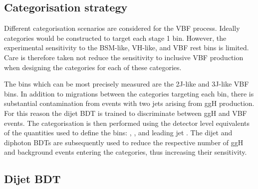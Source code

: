 \subsection{Categorisation strategy}

Different categorisation scenarios are considered for the VBF process.
Ideally categories would be constructed to target each stage 1 bin.
However, the experimental sensitivity to the BSM-like, VH-like, and VBF rest bins is limited.
Care is therefore taken not reduce the sensitivity to inclusive VBF production when designing 
the categories for each of these categories.

The bins which can be most precisely measured are the 2J-like and 3J-like VBF bins.
In addition to migrations between the categories targeting each bin, 
there is substantial contamination from events with two jets arising from ggH production.
For this reason the dijet BDT is trained to discriminate between ggH and VBF events.
The categorisation is then performed using the detector level equivalents
of the quantities used to define the bins: \mjj, \ptHjj, and leading jet \pt.
The dijet and diphoton BDTs are subsequently used 
to reduce the respective number of ggH and background events entering the categories, 
thus increasing their sensitivity.

\subsection{Dijet BDT}

